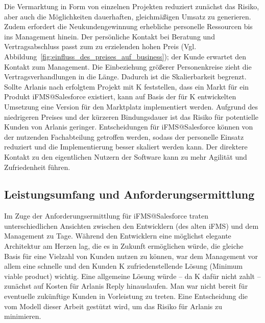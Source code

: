 Die Vermarktung in Form von einzelnen Projekten reduziert zunächst das Risiko, 
aber auch die Möglichkeiten dauerhaften, gleichmäßigen Umsatz zu generieren. 
Zudem erfordert die Neukundengewinnung erhebliche personelle Ressourcen bis ins 
Management hinein. Der persönliche Kontakt bei Beratung und Vertragsabschluss 
passt zum zu erzielenden hohen Preis (Vgl. 
Abbildung~\ref{fig:einfluss_des_preises_auf_business}); der Kunde erwartet den 
Kontakt zum Management. Die Einbeziehung größerer Personenkreise zieht die 
Vertragsverhandlungen in die Länge. Dadurch ist die Skalierbarkeit begrenzt. 
Sollte Arlanis nach erfolgtem Projekt mit K feststellen, dass ein Markt für ein 
Produkt iFMS@Salesforce existiert, kann auf Basis der für K entwickelten 
Umsetzung eine Version für den Marktplatz implementiert werden. Aufgrund des 
niedrigeren Preises und der kürzeren Bindungsdauer ist das Risiko für 
potentielle Kunden von Arlanis geringer. Entscheidungen für iFMS@Salesforce 
können von der nutzenden Fachabteilung getroffen werden, sodass der personelle 
Einsatz reduziert und die Implementierung besser skaliert werden kann. Der 
direktere Kontakt zu den eigentlichen Nutzern der Software kann zu mehr 
Agilität und Zufriedenheit führen.

\begin{comment}
Durch die Vermarktung als Projekt steigt für den Kunden die Investition und mit 
ihr das Risiko. In Folge werden -- anstatt das Produkt direkt an die 
Fachabteilungen zu vermarkten -- weiterhin in vielen Gremien langwierige 
Verhandlungen um den Leistungsumfang geführt, die in Lasten- und Pflichtenheften 
resultieren. Mit diesem Verlust an Agilität geht auch ein weiterer Verlust an 
Skalierbarkeit einher. Anstatt einem Kunden schnell die Lösung zu liefern und 
Umsätze zu generieren, muss der ISV erheblich in die Verhandlungen investieren, 
ohne das der Vertragsabschluss gesichert wäre.

Während eine personalintensive Wertschöpfung charakteristisch für 
Beratungsunternehmen ist, könnte Arlanis überdenken, ob der direkte Verkauf an 
Fachabteilungen durch Minderung des Risikos für den Kunden durch die 
Realisierung von Cloud-Vorteilen forciert werden könnte. 
\end{comment}

\subsection{Leistungsumfang und Anforderungsermittlung}
Im Zuge der Anforderungsermittlung für iFMS@Salesforce traten 
unterschiedlichen Ansichten zwischen den Entwicklern (des alten iFMS) und 
dem Management zu Tage. Während den Entwicklern eine möglichst elegante 
Architektur am Herzen lag, die es in Zukunft ermöglichen würde, die gleiche 
Basis für eine Vielzahl von Kunden nutzen zu können, war dem Management vor 
allem eine schnelle und den Kunden K zufriedenstellende Lösung (Minimum viable 
product) wichtig. Eine allgemeine Lösung würde -- da K dafür nicht zahlt -- 
zunächst auf Kosten für Arlanis Reply hinauslaufen. Man war nicht bereit für 
eventuelle zukünftige Kunden in Vorleistung zu treten. Eine Entscheidung die vom 
Modell dieser Arbeit gestützt wird, um das Risiko für Arlanis zu minimieren.

